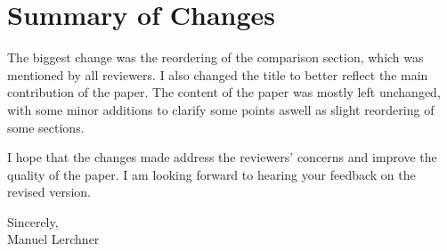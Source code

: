 \documentclass[12pt,a4paper]{article}
\begin{document}
\section*{Summary of Changes}

The biggest change was the reordering of the comparison section, which was mentioned by all reviewers. I also changed the title to better reflect the main contribution of the paper. The content of the paper was mostly left unchanged, with some minor additions to clarify some points aswell as slight reordering of some sections.

I hope that the changes made address the reviewers' concerns and improve the quality of the paper. I am looking forward to hearing your feedback on the revised version.

\vspace{1em}

\noindent Sincerely,\\
Manuel Lerchner
\end{document}
